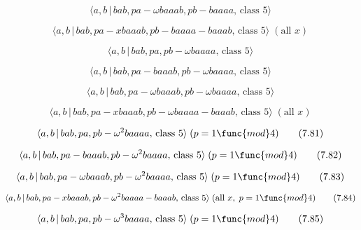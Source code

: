 \documentclass[10pt]{article}
\begin{document}
\begin{equation}
\langle a,b\,|\,bab,pa-\omega baaab,pb-baaaa,\,\text{class }5\rangle 
\tag{7.75}
\end{equation}

\begin{equation}
\langle a,b\,|\,bab,pa-xbaaab,pb-baaaa-baaab,\,\text{class }5\rangle \;(%
\text{all }x)  \tag{7.76}
\end{equation}

\begin{equation}
\langle a,b\,|\,bab,pa,pb-\omega baaaa,\,\text{class }5\rangle  \tag{7.77}
\end{equation}

\begin{equation}
\langle a,b\,|\,bab,pa-baaab,pb-\omega baaaa,\,\text{class }5\rangle 
\tag{7.78}
\end{equation}

\begin{equation}
\langle a,b\,|\,bab,pa-\omega baaab,pb-\omega baaaa,\,\text{class }5\rangle 
\tag{7.79}
\end{equation}

\begin{equation}
\langle a,b\,|\,bab,pa-xbaaab,pb-\omega baaaa-baaab,\,\text{class }5\rangle
\;(\text{all }x)  \tag{7.80}
\end{equation}

\begin{equation}
\langle a,b\,|\,bab,pa,pb-\omega ^{2}baaaa,\,\text{class }5\rangle \;(p=1%
\func{mod}4)  \tag{7.81}
\end{equation}

\begin{equation}
\langle a,b\,|\,bab,pa-baaab,pb-\omega ^{2}baaaa,\,\text{class }5\rangle
\;(p=1\func{mod}4)  \tag{7.82}
\end{equation}

\begin{equation}
\langle a,b\,|\,bab,pa-\omega baaab,pb-\omega ^{2}baaaa,\,\text{class }%
5\rangle \;(p=1\func{mod}4)  \tag{7.83}
\end{equation}

\begin{equation}
\langle a,b\,|\,bab,pa-xbaaab,pb-\omega ^{2}baaaa-baaab,\,\text{class }%
5\rangle \;(\text{all }x,\;p=1\func{mod}4)  \tag{7.84}
\end{equation}

\begin{equation}
\langle a,b\,|\,bab,pa,pb-\omega ^{3}baaaa,\,\text{class }5\rangle \;(p=1%
\func{mod}4)  \tag{7.85}
\end{equation}
\end{document}
